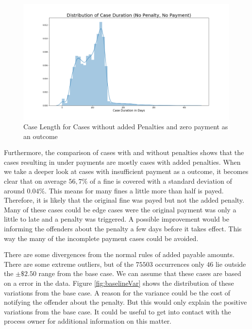 \documentclass[12pt]{report}
\begin{document}
\begin{figure}[H]
  \centering
  \includegraphics[width=\textwidth]{figures/no_penalty_send_fine.png}
  \caption{Case Length for Cases without added Penalties and zero payment as an outcome}
  \label{fig:send_fine_len}
\end{figure}

Furthermore, the comparison of cases with and without penalties shows that the cases resulting in under payments are mostly cases with added penalties. When we take a deeper look at cases with insufficient payment as a outcome, it becomes clear that on average $ 56,7 \% $ of a fine is covered with a standard deviation of around $ 0.04 \% $. This means for many fines a little more than half is payed. Therefore, it is likely that the original fine was payed but not the added penalty. Many of these cases could be edge cases were the original payment was only a little to late and a penalty was triggered. A possible improvement would be informing the offenders about the penalty a few days before it takes effect. This way the many of the incomplete payment cases could be avoided.

There are some divergences from the normal rules of added payable amounts. There are some extreme outliers, but of the $75503$ occurrences only $46$ lie outside the $ \pm \$2.50 $ range from the base case. We can assume that these cases are based on a error in the data. Figure \ref{fig:baselineVar} shows the distribution of these variations from the base case. A reason for the variance could be the cost of notifying the offender about the penalty. But this would only explain the positive variations from the base case. It could be useful to get into contact with the process owner for additional information on this matter. 

\end{document}
